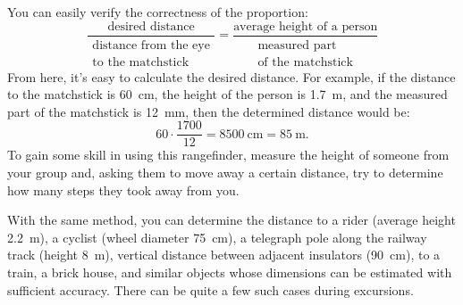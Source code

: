 You can easily verify the correctness of the proportion:
\begin{equation*}%
\frac{\text{desired distance}}{\begin{array}{c}\text{distance from the eye}\\ \text{to the matchstick}\end{array}} = \frac{\text{average height of a person}}{\begin{array}{c}\text{measured part}\\ \text{of the matchstick}\end{array}}
\end{equation*}
From here, it's easy to calculate the desired distance. For example, if the distance to the matchstick is \SI{60}{\centi\meter}, the height of the person is \SI{1.7}{\meter}, and the measured part of the matchstick is \SI{12}{\milli\meter}, then the determined distance would be:
\begin{equation*}%
60 \cdot \frac{1700}{12} = \SI{8500}{\centi\meter} = \SI{85}{\meter}.
\end{equation*}
To gain some skill in using this rangefinder, measure the height of someone from your group and, asking them to move away a certain distance, try to determine how many steps they took away from you.

With the same method, you can determine the distance to a rider (average height \SI{2.2}{\meter}), a cyclist (wheel diameter \SI{75}{\centi\meter}), a telegraph pole along the railway track (height \SI{8}{\meter}), vertical distance between adjacent insulators (\SI{90}{\centi\meter}), to a train, a brick house, and similar objects whose dimensions can be estimated with sufficient accuracy. There can be quite a few such cases during excursions.


